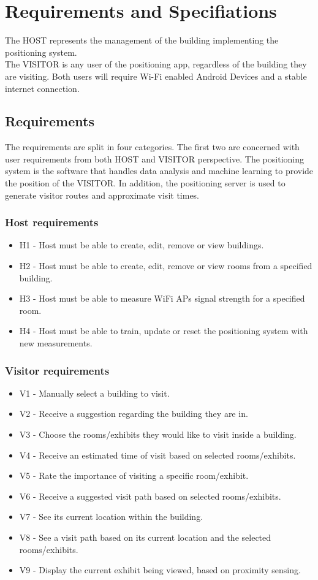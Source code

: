 \chapter{Requirements and Specifiations}
\noindent The HOST represents the management of the building implementing the positioning system.\\ 
The VISITOR is any user of the positioning app, regardless of the building they are visiting.
Both users will require Wi-Fi enabled Android Devices and a stable internet connection.

\section{Requirements}
The requirements are split in four categories. The first two are concerned with user requirements from both HOST and VISITOR perspective. The positioning system is the software that handles data analysis and machine learning to provide the position of the VISITOR. In addition, the positioning server is used to generate visitor routes and approximate visit times.

\subsection{Host requirements}
	\begin{itemize}
		\item H1 - Host must be able to create, edit, remove or view buildings.
		\item H2 - Host must be able to create, edit, remove or view rooms from a specified building.
		\item H3 - Host must be able to measure WiFi APs signal strength for a specified room.
		\item H4 - Host must be able to train, update or reset the positioning system with new measurements.
	\end{itemize}

\subsection{Visitor requirements}
	\begin{itemize}
		\item V1 - Manually select a building to visit.
		\item V2 - Receive a suggestion regarding the building they are in.
		\item V3 - Choose the rooms/exhibits they would like to visit inside a building.
		\item V4 - Receive an estimated time of visit based on selected rooms/exhibits.
		\item V5 - Rate the importance of visiting a specific room/exhibit.
		\item V6 - Receive a suggested visit path based on selected rooms/exhibits.
		\item V7 - See its current location within the building.
		\item V8 - See a visit path based on its current location and the selected rooms/exhibits.
		\item V9 - Display the current exhibit being viewed, based on proximity sensing.
	\end{itemize}

